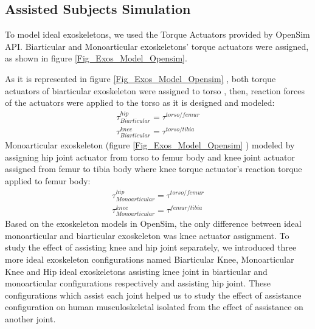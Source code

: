 \documentclass[10pt,letterpaper]{article}
\begin{document}
\subsection*{Assisted Subjects Simulation}
To model ideal exoskeletons, we used the Torque Actuators provided by OpenSim API\cite{103}. Biarticular and Monoarticular exoskeletons' torque actuators were assigned, as shown in figure \ref{Fig_Exos_Model_Opensim}.
\begin{figure*}[h!]
	\centering
	\hfil
	\caption{Exoskeletons modeling on OpenSim}
	\label{Fig_Exos_Model_Opensim}
\end{figure*}
As it is represented in figure \ref{Fig_Exos_Model_Opensim} , both torque actuators of biarticular exoskeleton were assigned to torso , then, reaction forces of the actuators were applied to the torso as it is designed and modeled:
\begin{align}\label{Eqn_Biarticular_Torque_Act}
\tau^{hip}_{Biarticular} = \tau^{torso/femur}\\
\tau^{knee}_{Biarticular} = \tau^{torso/tibia}
\end{align}
Monoarticular exoskeleton (figure \ref{Fig_Exos_Model_Opensim} ) modeled by assigning hip joint actuator from torso to femur body and knee joint actuator assigned from femur to tibia body where knee torque actuator's reaction torque applied to femur body:
\begin{align}\label{Eqn_Monoarticular_Torque_Act}
\tau^{hip}_{Monoarticular} = \tau^{torso/femur}\\
\tau^{knee}_{Monoarticular} = \tau^{femur/tibia}
\end{align}
Based on the exoskeleton models in OpenSim, the only difference between ideal monoarticular and biarticular exoskeleton was knee actuator assignment. To study the effect of assisting knee and hip joint separately, we introduced three more ideal exoskeleton configurations named Biarticular Knee, Monoarticular Knee and Hip ideal exoskeletons assisting knee joint in biarticular and monoarticular configurations respectively and assisting hip joint. These configurations which assist each joint helped us to study the effect of assistance configuration on human musculoskeletal isolated from the effect of assistance on another joint.\\
\end{document}
